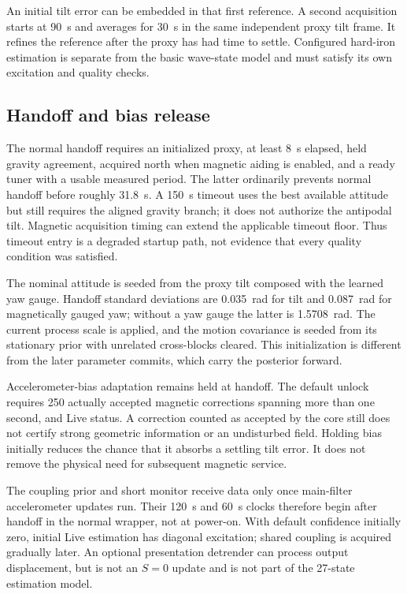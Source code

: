 \documentclass[conference]{IEEEtran}
\begin{document}
An initial tilt error can be embedded in that first reference. A second
acquisition starts at 90~s and averages for 30~s in the same independent
proxy tilt frame. It refines the reference after the proxy has had time
to settle. Configured hard-iron estimation is separate from the basic
wave-state model and must satisfy its own excitation and quality checks.

\subsection{Handoff and bias release}
The normal handoff requires an initialized proxy, at least 8~s elapsed,
held gravity agreement, acquired north when magnetic aiding is enabled,
and a ready tuner with a usable measured period. The latter ordinarily
prevents normal handoff before roughly 31.8~s. A 150~s timeout uses the
best available attitude but still requires the aligned gravity branch;
it does not authorize the antipodal tilt. Magnetic acquisition timing can
extend the applicable timeout floor. Thus timeout entry is a degraded
startup path, not evidence that every quality condition was satisfied.

The nominal attitude is seeded from the proxy tilt composed with the
learned yaw gauge. Handoff standard deviations are 0.035~rad for tilt and
0.087~rad for magnetically gauged yaw; without a yaw gauge the latter is
1.5708~rad. The current process scale is applied, and the motion covariance
is seeded from its stationary prior with unrelated cross-blocks cleared.
This initialization is different from the later parameter commits, which
carry the posterior forward.

Accelerometer-bias adaptation remains held at handoff. The default unlock
requires 250 actually accepted magnetic corrections spanning more than
one second, and Live status. A correction counted as accepted by the core
still does not certify strong geometric information or an undisturbed
field. Holding bias initially reduces the chance that it absorbs a
settling tilt error. It does not remove the physical need for subsequent
magnetic service.

The coupling prior and short monitor receive data only once main-filter
accelerometer updates run. Their 120~s and 60~s clocks therefore begin
after handoff in the normal wrapper, not at power-on. With default
confidence initially zero, initial Live estimation has diagonal excitation;
shared coupling is acquired gradually later. An optional presentation
detrender can process output displacement, but is not an $S=0$ update
and is not part of the 27-state estimation model.
\end{document}
